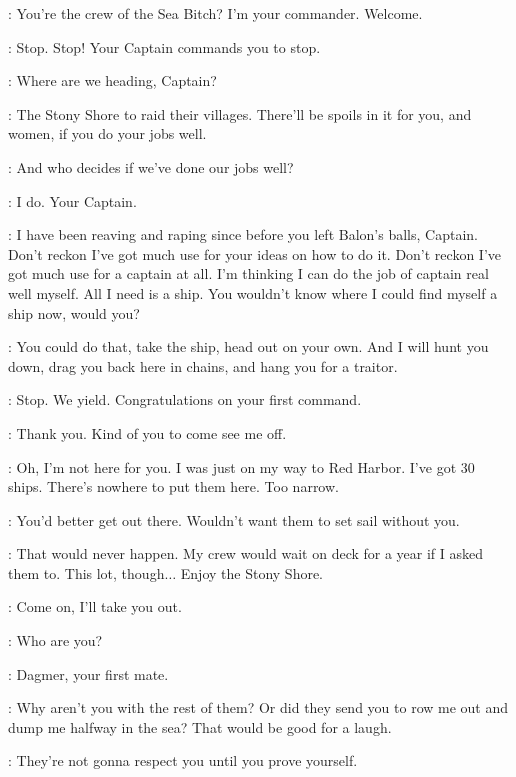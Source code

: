 \THEON: You're the crew of the Sea Bitch? I'm your commander. Welcome. 


\THEON: Stop. Stop! Your Captain commands you to stop. 

\LORREN: Where are we heading, Captain? 

\THEON: The Stony Shore to raid their villages. There'll be spoils in it for you, and women, if you do your jobs well. 

\LORREN: And who decides if we've done our jobs well? 

\THEON: I do. Your Captain. 

\LORREN: I have been reaving and raping since before you left Balon's balls, Captain. Don't reckon I've got much use for your ideas on how to do it. Don't reckon I've got much use for a captain at all. I'm thinking I can do the job of captain real well myself. All I need is a ship. You wouldn't know where I could find myself a ship now, would you? 

\THEON: You could do that, take the ship, head out on your own. And I will hunt you down, drag you back here in chains, and hang you for a traitor. 


\YARA: Stop. We yield. Congratulations on your first command. 

\THEON: Thank you. Kind of you to come see me off. 

\YARA: Oh, I'm not here for you. I was just on my way to Red Harbor. I've got 30 ships. There's nowhere to put them here. Too narrow. 

\THEON: You'd better get out there. Wouldn't want them to set sail without you. 

\YARA: That would never happen. My crew would wait on deck for a year if I asked them to. This lot, though$\ldots$ Enjoy the Stony Shore. 


\DAGMER: Come on, I'll take you out. 

\THEON: Who are you? 

\DAGMER: Dagmer, your first mate. 

\THEON: Why aren't you with the rest of them? Or did they send you to row me out and dump me halfway in the sea? That would be good for a laugh. 

\DAGMER: They're not gonna respect you until you prove yourself. 

